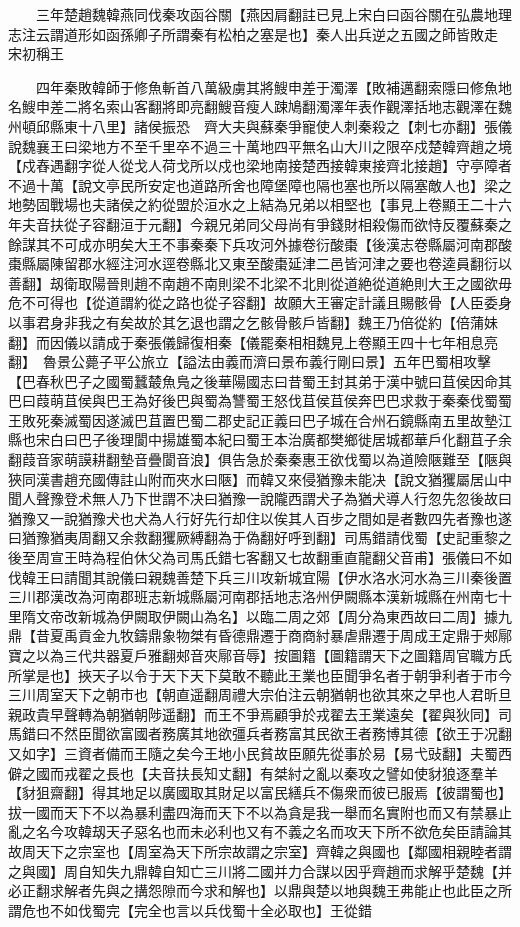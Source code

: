 　　三年楚趙魏韓燕同伐秦攻函谷關【燕因肩翻註已見上宋白曰函谷關在弘農地理志注云謂道形如函孫卿子所謂秦有松柏之塞是也】秦人出兵逆之五國之師皆敗走　宋初稱王

　　四年秦敗韓師于修魚斬首八萬級虜其將䱸申差于濁澤【敗補邁翻索隱曰修魚地名䱸申差二將名索山客翻將即亮翻䱸音瘦人踈鳩翻濁澤年表作觀澤括地志觀澤在魏州頓邱縣東十八里】諸侯振恐　齊大夫與蘇秦爭寵使人刺秦殺之【刺七亦翻】張儀說魏襄王曰梁地方不至千里卒不過三十萬地四平無名山大川之限卒戍楚韓齊趙之境【戍舂遇翻字從人從戈人荷戈所以戍也梁地南接楚西接韓東接齊北接趙】守亭障者不過十萬【說文亭民所安定也道路所舍也障堡障也隔也塞也所以隔塞敵人也】梁之地勢固戰場也夫諸侯之約從盟於洹水之上結為兄弟以相堅也【事見上卷顯王二十六年夫音扶從子容翻洹于元翻】今親兄弟同父母尚有爭錢財相殺傷而欲恃反覆蘇秦之餘謀其不可成亦明矣大王不事秦秦下兵攻河外據卷衍酸棗【後漢志卷縣屬河南郡酸棗縣屬陳留郡水經注河水逕卷縣北又東至酸棗延津二邑皆河津之要也卷逵員翻衍以善翻】刼衛取陽晉則趙不南趙不南則梁不北梁不北則從道絶從道絶則大王之國欲毋危不可得也【從道謂約從之路也從子容翻】故願大王審定計議且賜骸骨【人臣委身以事君身非我之有矣故於其乞退也謂之乞骸骨骸戶皆翻】魏王乃倍從約【倍蒲妹翻】而因儀以請成于秦張儀歸復相秦【儀罷秦相相魏見上卷顯王四十七年相息亮翻】　魯景公薨子平公旅立【謚法由義而濟曰景布義行剛曰景】五年巴蜀相攻擊【巴春秋巴子之國蜀蠶樷魚鳬之後華陽國志曰昔蜀王封其弟于漢中號曰苴侯因命其巴曰葭萌苴侯與巴王為好後巴與蜀為讐蜀王怒伐苴侯苴侯奔巴巴求救于秦秦伐蜀蜀王敗死秦滅蜀因遂滅巴苴置巴蜀二郡史記正義曰巴子城在合州石鏡縣南五里故墊江縣也宋白曰巴子後理閬中揚雄蜀本紀曰蜀王本治廣都樊鄉徙居城都華戶化翻苴子余翻葭音家萌謨耕翻墊音疊閬音浪】俱告急於秦秦惠王欲伐蜀以為道險陿難至【陿與狹同漢書趙充國傳註山附而夾水曰陿】而韓又來侵猶豫未能决【說文猶玃屬居山中聞人聲豫登术無人乃下世謂不决曰猶豫一說隴西謂犬子為猶犬導人行忽先忽後故曰猶豫又一說猶豫犬也犬為人行好先行却住以俟其人百步之間如是者數四先者豫也遂曰猶豫猶夷周翻又余救翻玃厥縛翻為于偽翻好呼到翻】司馬錯請伐蜀【史記重黎之後至周宣王時為程伯休父為司馬氏錯七客翻又七故翻重直龍翻父音甫】張儀曰不如伐韓王曰請聞其說儀曰親魏善楚下兵三川攻新城宜陽【伊水洛水河水為三川秦後置三川郡漢改為河南郡班志新城縣屬河南郡括地志洛州伊闕縣本漢新城縣在州南七十里隋文帝改新城為伊闕取伊闕山為名】以臨二周之郊【周分為東西故曰二周】據九鼎【昔夏禹貢金九牧鑄鼎象物桀有昏德鼎遷于商商紂暴虐鼎遷于周成王定鼎于郟鄏寶之以為三代共器夏戶雅翻郟音夾鄏音辱】按圖籍【圖籍謂天下之圖籍周官職方氏所掌是也】挾天子以令于天下天下莫敢不聽此王業也臣聞爭名者于朝爭利者于市今三川周室天下之朝市也【朝直遥翻周禮大宗伯注云朝猶朝也欲其來之早也人君昕旦親政貴早聲轉為朝猶朝陟遥翻】而王不爭焉顧爭於戎翟去王業遠矣【翟與狄同】司馬錯曰不然臣聞欲富國者務廣其地欲彊兵者務富其民欲王者務博其德【欲王于况翻又如字】三資者備而王隨之矣今王地小民貧故臣願先從事於易【易弋䜴翻】夫蜀西僻之國而戎翟之長也【夫音扶長知丈翻】有桀紂之亂以秦攻之譬如使豺狼逐羣羊【豺狙齋翻】得其地足以廣國取其財足以富民繕兵不傷衆而彼已服焉【彼謂蜀也】拔一國而天下不以為暴利盡四海而天下不以為貪是我一舉而名實附也而又有禁暴止亂之名今攻韓刼天子惡名也而未必利也又有不義之名而攻天下所不欲危矣臣請論其故周天下之宗室也【周室為天下所宗故謂之宗室】齊韓之與國也【鄰國相親睦者謂之與國】周自知失九鼎韓自知亡三川將二國并力合謀以因乎齊趙而求解乎楚魏【并必正翻求解者先與之搆怨隙而今求和解也】以鼎與楚以地與魏王弗能止也此臣之所謂危也不如伐蜀完【完全也言以兵伐蜀十全必取也】王從錯